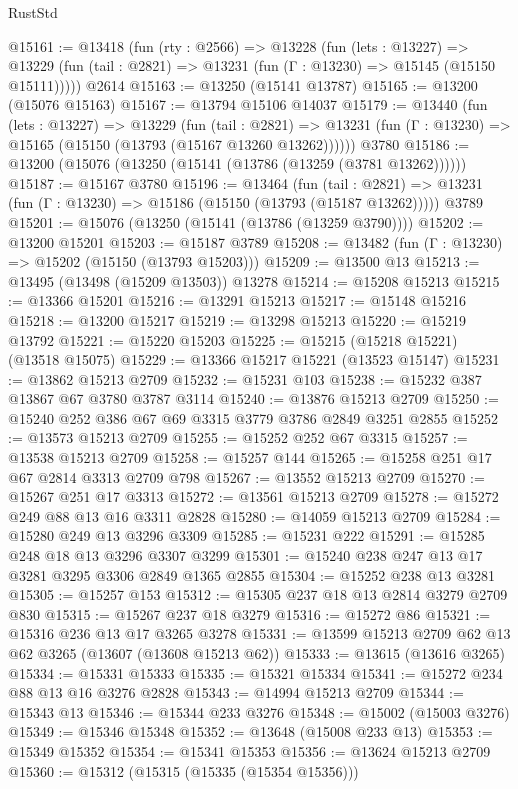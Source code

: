 \begin{lexlean}{RustStd}
\begin{coremodule}
@15161 := @13418
    (fun (rty : @2566) =>
    @13228
      (fun (lets : @13227) =>
      @13229 (fun (tail : @2821) => @13231 (fun (Γ : @13230) => @15145 (@15150 @15111)))))
    @2614
@15163 := @13250 (@15141 @13787)
@15165 := @13200 (@15076 @15163)
@15167 := @13794 @15106 @14037
@15179 := @13440
    (fun (lets : @13227) =>
    @13229
      (fun (tail : @2821) =>
      @13231 (fun (Γ : @13230) => @15165 (@15150 (@13793 (@15167 @13260 @13262))))))
    @3780
@15186 := @13200 (@15076 (@13250 (@15141 (@13786 (@13259 (@3781 @13262))))))
@15187 := @15167 @3780
@15196 := @13464
    (fun (tail : @2821) => @13231 (fun (Γ : @13230) => @15186 (@15150 (@13793 (@15187 @13262)))))
    @3789
@15201 := @15076 (@13250 (@15141 (@13786 (@13259 @3790))))
@15202 := @13200 @15201
@15203 := @15187 @3789
@15208 := @13482 (fun (Γ : @13230) => @15202 (@15150 (@13793 @15203)))
@15209 := @13500 @13
@15213 := @13495 (@13498 (@15209 @13503)) @13278
@15214 := @15208 @15213
@15215 := @13366 @15201
@15216 := @13291 @15213
@15217 := @15148 @15216
@15218 := @13200 @15217
@15219 := @13298 @15213
@15220 := @15219 @13792
@15221 := @15220 @15203
@15225 := @15215 (@15218 @15221) (@13518 @15075)
@15229 := @13366 @15217 @15221 (@13523 @15147)
@15231 := @13862 @15213 @2709
@15232 := @15231 @103
@15238 := @15232 @387 @13867 @67 @3780 @3787 @3114
@15240 := @13876 @15213 @2709
@15250 := @15240 @252 @386 @67 @69 @3315 @3779 @3786 @2849 @3251 @2855
@15252 := @13573 @15213 @2709
@15255 := @15252 @252 @67 @3315
@15257 := @13538 @15213 @2709
@15258 := @15257 @144
@15265 := @15258 @251 @17 @67 @2814 @3313 @2709 @798
@15267 := @13552 @15213 @2709
@15270 := @15267 @251 @17 @3313
@15272 := @13561 @15213 @2709
@15278 := @15272 @249 @88 @13 @16 @3311 @2828
@15280 := @14059 @15213 @2709
@15284 := @15280 @249 @13 @3296 @3309
@15285 := @15231 @222
@15291 := @15285 @248 @18 @13 @3296 @3307 @3299
@15301 := @15240 @238 @247 @13 @17 @3281 @3295 @3306 @2849 @1365 @2855
@15304 := @15252 @238 @13 @3281
@15305 := @15257 @153
@15312 := @15305 @237 @18 @13 @2814 @3279 @2709 @830
@15315 := @15267 @237 @18 @3279
@15316 := @15272 @86
@15321 := @15316 @236 @13 @17 @3265 @3278
@15331 := @13599 @15213 @2709 @62 @13 @62 @3265 (@13607 (@13608 @15213 @62))
@15333 := @13615 (@13616 @3265)
@15334 := @15331 @15333
@15335 := @15321 @15334
@15341 := @15272 @234 @88 @13 @16 @3276 @2828
@15343 := @14994 @15213 @2709
@15344 := @15343 @13
@15346 := @15344 @233 @3276
@15348 := @15002 (@15003 @3276)
@15349 := @15346 @15348
@15352 := @13648 (@15008 @233 @13)
@15353 := @15349 @15352
@15354 := @15341 @15353
@15356 := @13624 @15213 @2709
@15360 := @15312 (@15315 (@15335 (@15354 @15356)))

\end{coremodule}
\end{lexlean}

